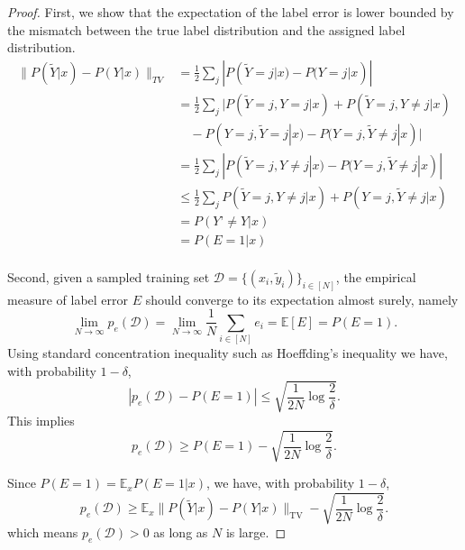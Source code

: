     \begin{proof}
    
    First, we show that the expectation of the label error is lower bounded by the mismatch between the true label distribution and the assigned label distribution.
    \begin{equation}
    \begin{aligned}
    \|P(\tilde{Y}|x) - P(Y|x)\|_{TV} 
    & = \frac{1}{2} \sum_j |P(\tilde{Y}=j|x) - P(Y=j|x)|  \\
    & = \frac{1}{2} \sum_j |P(\tilde{Y}=j, Y=j|x) + P(\tilde{Y}=j, Y\ne j|x) \\
    & \quad - P(Y=j, \tilde{Y}=j|x)- P(Y=j, \tilde{Y}\ne j|x)| \\
    & =  \frac{1}{2} \sum_j | P(\tilde{Y}=j, Y\ne j|x) - P(Y=j, \tilde{Y}\ne j|x)| \\
    & \le \frac{1}{2} \sum_j  P(\tilde{Y}=j, Y\ne j|x) + P(Y=j, \tilde{Y}\ne j|x) \\
    & = P(Y’\ne Y | x) \\
    & = P(E=1|x)\\
    \end{aligned}
    \end{equation}
    
    Second, given a sampled training set $\mathcal{D}=\{(x_i, \tilde{y}_i)\}_{i\in [N]}$, the empirical measure of label error $E$ should converge to its expectation almost surely, namely
    $$
    \lim_{N\to \infty} p_e(\mathcal{D}) = \lim_{N\to \infty} \frac{1}{N} \sum_{i\in [N]} e_i = \mathbb{E} [E] = P(E = 1).
    $$
    Using standard concentration inequality such as Hoeffding's inequality we have, 
    with probability $ 1 - \delta$,
    $$
    |p_e(\mathcal{D}) - P(E = 1)| \le \sqrt{\frac{1}{2N}\log\frac{2}{\delta}}.
    $$
    This implies
    $$
    p_e(\mathcal{D}) \ge P(E=1) -  \sqrt{\frac{1}{2N}\log\frac{2}{\delta}}.    
    $$
    
    Since $P(E = 1) = \mathbb{E}_x P(E=1|x)$, we have, with probability $1 - \delta$,
    $$
    p_e(\mathcal{D}) \ge \mathbb{E}_x \|P(\tilde{Y}| x) - P(Y | x)\|_{\text{TV}} -\sqrt{\frac{1}{2N}\log\frac{2}{\delta}} .
    $$
    which means $p_e(\mathcal{D}) > 0$ as long as $N$ is large.
    
    \end{proof}
    
